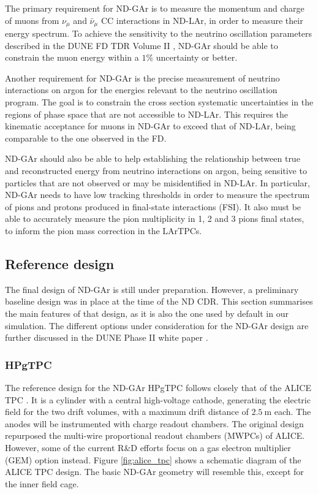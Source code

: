 The primary requirement for ND-GAr is to measure the momentum and charge of muons from $\nu_{\mu}$ and $\bar{\nu}_{\mu}$ CC interactions in ND-LAr, in order to measure their energy spectrum. To achieve the sensitivity to the neutrino oscillation parameters described in the DUNE FD TDR Volume II \cite{DUNE2020TDR2}, ND-GAr should be able to constrain the muon energy within a $1\%$ uncertainty or better.

Another requirement for ND-GAr is the precise measurement of neutrino interactions on argon for the energies relevant to the neutrino oscillation program. The goal is to constrain the cross section systematic uncertainties in the regions of phase space that are not accessible to ND-LAr. This requires the kinematic acceptance for muons in ND-GAr to exceed that of ND-LAr, being comparable to the one observed in the FD.

ND-GAr should also be able to help establishing the relationship between true and reconstructed energy from neutrino interactions on argon, being sensitive to particles that are not observed or may be misidentified in ND-LAr. In particular, ND-GAr needs to have low tracking thresholds in order to measure the spectrum of pions and protons produced in final-state interactions (FSI). It also must be able to accurately measure the pion multiplicity in 1, 2 and 3 pions final states, to inform the pion mass correction in the LArTPCs.

\subsection{Reference design}\label{subsec:ndgar_design}

The final design of ND-GAr is still under preparation. However, a preliminary baseline design was in place at the time of the ND CDR. This section summarises the main features of that design, as it is also the one used by default in our simulation. The different options under consideration for the ND-GAr design are further discussed in the DUNE Phase II white paper \cite{DUNE2024Phase2}.

\subsubsection{HPgTPC}

The reference design for the ND-GAr HPgTPC follows closely that of the ALICE TPC \cite{ALICE2006}. It is a cylinder with a central high-voltage cathode, generating the electric field for the two drift volumes, with a maximum drift distance of $2.5~\mathrm{m}$ each. The anodes will be instrumented with charge readout chambers. The original design repurposed the multi-wire proportional readout chambers (MWPCs) of ALICE. However, some of the current R\&D efforts focus on a gas electron multiplier (GEM) \cite{Sauli1997} option instead. Figure \ref{fig:alice_tpc} shows a schematic diagram of the ALICE TPC design. The basic ND-GAr geometry will resemble this, except for the inner field cage.


